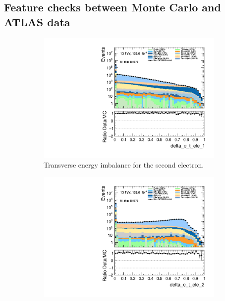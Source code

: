 \subsection*{Feature checks between Monte Carlo and ATLAS data}

\begin{figure}
    \centering
    \begin{subfigure}{.49\textwidth}
        \includegraphics[width=\textwidth]{Figures/MC_Data_comp/delta_e_t_ele_1.pdf}
        \caption{Transverse energy imbalance for the second electron.}
        \label{fig:delta_e_t_ele_1}
    \end{subfigure}
    \hfill
    \begin{subfigure}{.49\textwidth}
        \includegraphics[width=\textwidth]{Figures/MC_Data_comp/delta_e_t_ele_2.pdf}

\end{subfigure}
\end{figure}
